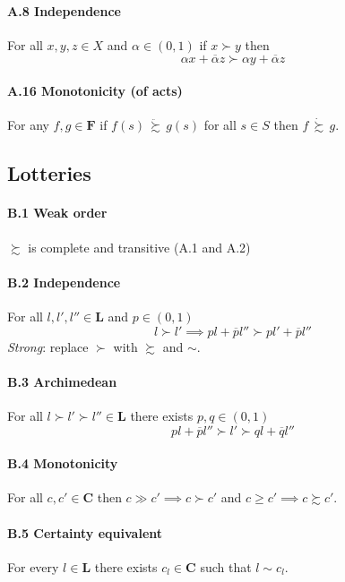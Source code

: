 \documentclass[landscape, 12pt]{extarticle}
\begin{document}
\begin{multicols}{2}
	\paragraph{A.8 Independence}
	For all $x, y, z \in X$ and $\alpha \in (0,1)$
	if $x \succ y$ then
	\[
		\alpha x + \overline \alpha z \succ \alpha y + \overline \alpha z
	\]

	\paragraph{A.16 Monotonicity (of acts)}
	For any $f, g \in \bm F$ if $f(s) \, \ddot \succsim \, g(s)$ for all $s \in S$
	then $f \, \dot \succsim \, g$.

	\subsection{Lotteries}
	\paragraph{B.1 Weak order}
	$\succsim$ is complete and transitive (A.1 and A.2)

	\paragraph{B.2 Independence}
	For all $l, l', l'' \in \bm L$ and $p \in (0,1)$
	\[
		l \succ l' \implies pl + \overline p l'' \succ p l' + \overline p l''
	\]
	\textit{Strong}: replace $\succ$ with $\succsim$ and $\sim$.

	\paragraph{B.3 Archimedean}
	For all $l \succ l' \succ l'' \in \bm L$ there exists $p,q \in (0,1)$
	\[
		pl + \overline p l'' \succ l' \succ ql + \overline q l''
	\]

	\paragraph{B.4 Monotonicity}
	For all $c, c' \in \bm C$ then $c \gg c' \implies c\succ c'$ and $c \geq c' \implies c \succsim c'$.

	\paragraph{B.5 Certainty equivalent}
	For every $l \in \bm L$ there exists $c_l \in \bm C$ such that $l \sim c_l$.


\end{multicols}
\end{document}
